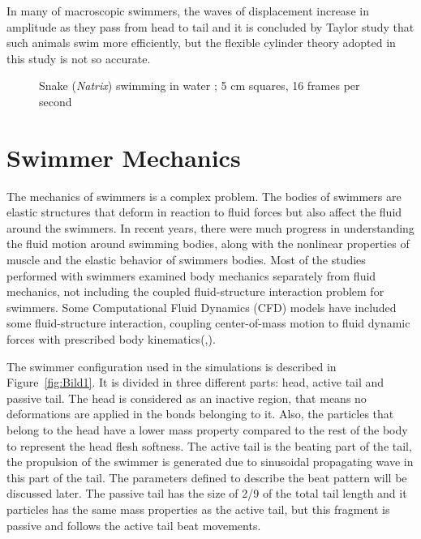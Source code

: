 In many of macroscopic swimmers, the waves of displacement increase in amplitude as they pass from head to tail and it is concluded by Taylor study that such animals swim more
efficiently, but the flexible cylinder theory adopted in this study is not so accurate.


\begin{figure}[H]
\centering
  \begin{footnotesize}
  
  \caption[Snake (\textit{Natrix}) swimming in water ; 5 cm squares, 16 frames per second \cite{taylor_analysis_1952}]{Snake (\textit{Natrix}) swimming in water ; 5 cm squares, 16 frames per second \cite{taylor_analysis_1952}}
  \label{fig:Bild2.2}
  \end{footnotesize}
\end{figure} 



\section{Swimmer Mechanics}
\label{sec:section 2}
The mechanics of swimmers is a complex problem\cite{tytell_interactions_2010}. The bodies of swimmers are elastic structures that deform in reaction to fluid forces but also affect the fluid around the swimmers.
In recent years, there were much progress in understanding the fluid motion around swimming bodies\cite{shadwick_fish_2006}, along with the nonlinear properties of muscle\cite{williams_new_2010} and the elastic behavior of 
swimmers bodies\cite{williams_new_2010}. Most of the studies performed with swimmers examined body mechanics separately from fluid mechanics, not including the coupled
fluid-structure interaction problem for swimmers. Some Computational Fluid Dynamics (CFD) models have included some fluid-structure interaction, coupling center-of-mass motion to 
fluid dynamic forces with prescribed body kinematics(\cite{kern_simulations_2006},\cite{borazjani_role_2010}).

\par

The swimmer configuration used in the simulations is described in Figure~\ref{fig:Bild1}. It is divided in three different parts: head, active tail and passive tail. The head 
is considered as an inactive region, that means no deformations are applied in the bonds belonging to it. Also, the particles that belong to the head have a lower mass property
compared to the rest of the body to represent the head flesh softness. The active tail is the beating part of the tail, the propulsion of the swimmer is generated due to sinusoidal 
propagating wave in this part of the tail. The parameters defined to describe the beat pattern will be discussed later. The passive tail has the size of 2/9 of the total tail length
and it particles has the same mass properties as the active tail, but this fragment is passive and follows the active tail beat movements. 


